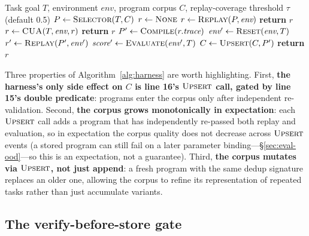 \documentclass[11pt]{article}
\begin{document}
\begin{algorithm}[t]
\caption{PreAct verified compile-extend-replace loop}
\label{alg:harness}
\begin{algorithmic}[1]
\Require Task goal $T$, environment $\textit{env}$, program corpus $C$, replay-coverage threshold $\tau$ (default 0.5)
\State $P \gets \textsc{Selector}(T, C)$ 
\State $r \gets \textsc{None}$
  \State $r \gets \textsc{Replay}(P, \textit{env})$ 
    \State \textbf{return} $r$ 
  \EndIf
\EndIf
\State $r \gets \textsc{CUA}(T, \textit{env}, r)$ 
 \textbf{return} $r$ \EndIf
\State $P' \gets \textsc{Compile}(r.\textit{trace})$ 
\State $\textit{env}' \gets \textsc{Reset}(\textit{env}, T)$ 
\State $r' \gets \textsc{Replay}(P', \textit{env}')$
\State $\textit{score}' \gets \textsc{Evaluate}(\textit{env}', T)$
 
  \State $C \gets \textsc{Upsert}(C, P')$ 
\EndIf
\State \textbf{return} $r$
\end{algorithmic}
\end{algorithm}

Three properties of Algorithm~\ref{alg:harness} are worth highlighting. First, \textbf{the harness's only side effect on $C$ is line 16's $\textsc{Upsert}$ call, gated by line 15's double predicate}: programs enter the corpus only after independent re-validation. Second, \textbf{the corpus grows monotonically in expectation}: each $\textsc{Upsert}$ call adds a program that has independently re-passed both replay and evaluation, so in expectation the corpus quality does not decrease across $\textsc{Upsert}$ events (a stored program can still fail on a later parameter binding---\S\ref{sec:eval-ood}---so this is an expectation, not a guarantee). Third, \textbf{the corpus mutates via $\textsc{Upsert}$, not just append}: a fresh program with the same dedup signature replaces an older one, allowing the corpus to refine its representation of repeated tasks rather than just accumulate variants.

\subsection{The verify-before-store gate}
\label{sec:arch-gate}
\end{document}
